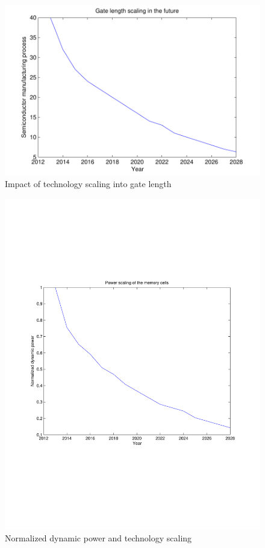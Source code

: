 \documentclass[12pt,a4paper]{article}
\begin{document}
\begin{figure}[t!]
 \centering
 \includegraphics[width = \textwidth]{gate.pdf}
  \caption{Impact of technology scaling into gate length}
 \label{fig:gateE}
 \end{figure}
 
 \begin{figure}[t!]
 \centering
 \includegraphics[width = \textwidth]{cellpower.pdf}
  \caption{Normalized dynamic power and technology scaling}
 \label{fig:powerE}
 \end{figure}
\end{document}
